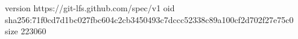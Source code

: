 version https://git-lfs.github.com/spec/v1
oid sha256:71f0cd7d1bc027fbc604c2cb3450493c7dccc52338c89a100cf2d702f27e75c0
size 223060
